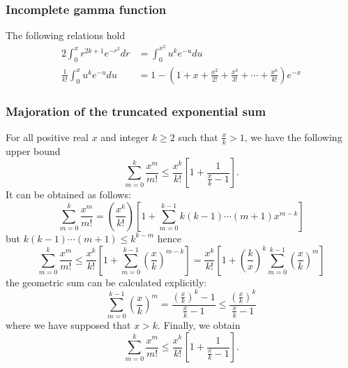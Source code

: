 \documentclass[aps,prl,showpacs,twocolumn]{revtex4-2}
\newcommand{\beq}{\begin{equation}}
\newcommand{\eeq}{\end{equation}}
\begin{document}
\subsubsection{Incomplete gamma function}
The following relations hold~\cite{abramowitz_64}
\begin{align}
	\label{eq:gammaidentities}
	2\int_0^x r^{2k+1}e^{-r^2}dr & = \int_0^{x^2} u^k e^{-u} du \\
	\frac{1}{k!}\int_{0}^x u^k e^{-u}du	&= 1 -\left(1+x+\frac{x^2}{2!} + \frac{x^3}{3!} + \cdots +  \frac{x^k}{k!} \right) e^{-x}
\end{align}
\subsubsection{Majoration of the truncated exponential sum}
For all positive real $x$  and integer $k\geq 2$ such that $\frac{x}{k} >1$, we have the following upper bound
\beq
\label{eq:majorationTruncExp}
\sum_{m=0}^{k} \frac{x^m}{m!} \leq \frac{x^k}{k!}
\left[
1 + \frac{1}{\frac{x}{k} -1}
\right].
\eeq
It  can be obtained as follows:
\[
\sum_{m=0}^{k} \frac{x^m}{m!}
= \left(\frac{x^k}{k!}\right)\left[
1 +  \sum_{m=0}^{k-1} k(k-1)\cdots (m+1) x^{m-k}
\right]
\]
but $k(k-1)\cdots (m+1) \leq k^{k-m}$ hence
\[
\sum_{m=0}^{k} \frac{x^m}{m!} \leq
\frac{x^k}{k!}\left[
1 +  \sum_{m=0}^{k-1} \left(\frac{x}{k}\right)^{m-k}
\right] =
\frac{x^k}{k!}\left[
1 +  \left(\frac{k}{x}\right)^k\sum_{m=0}^{k-1} \left(\frac{x}{k}\right)^{m}
\right]
\]
the geometric sum can be calculated explicitly:
\[
\sum_{m=0}^{k-1} \left(\frac{x}{k}\right)^{m} = \frac{\left(\frac{x}{k}\right)^k-1}{\frac{x}{k} -1} \leq \frac{\left(\frac{x}{k}\right)^k}{\frac{x}{k} -1}
\]
where we have supposed that $x > k$.
Finally, we obtain
\[
\sum_{m=0}^{k} \frac{x^m}{m!} \leq \frac{x^k}{k!}
\left[
1 + \frac{1}{\frac{x}{k} -1}
\right].
\]
\end{document}

